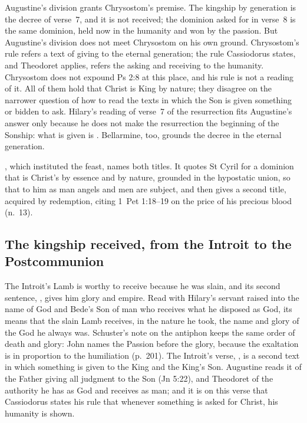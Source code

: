 Augustine's division grants Chrysostom's premise. The kingship by generation
is the decree of verse~7, and it is not received; the dominion asked for in
verse~8 is the same dominion, held now in the humanity and won by the passion.
But Augustine's division does not meet Chrysostom on his own ground. Chrysostom's rule refers a text
of giving to the eternal generation; the rule Cassiodorus states, and
Theodoret applies, refers the asking and receiving to the humanity. Chrysostom
does not expound Ps 2:8 at this place, and his rule is not a reading of it.
All of them hold that Christ is King by nature; they disagree on the narrower
question of how to read the texts in which the Son is given something or
bidden to ask. Hilary's reading of verse~7 of the resurrection fits Augustine's
answer only because he does not make the resurrection the beginning of the
Sonship: what is given is . Bellarmine, too,
grounds the decree in the eternal generation.

, which instituted the feast, names both titles. It quotes
St Cyril for a dominion that is Christ's by essence and by nature, grounded in
the hypostatic union, so that to him as man angels and men are subject, and
then gives a second title, acquired by redemption, citing 1~Pet 1:18--19 on the price of his precious
blood (n.~13).

\subsection{The kingship received, from the Introit to the Postcommunion}
\label{sec:lamb-elements}

The Introit's Lamb  is worthy to receive because he was
slain, and its second sentence, , gives him
glory and empire. Read with Hilary's servant raised into the name of God and
Bede's Son of man who receives what he disposed as God, its  means that the slain Lamb receives, in the nature he took,
the name and glory of the God he always was. Schuster's note on the antiphon
keeps the same order of death and glory: John names the Passion before the
glory, because the exaltation is in proportion to the humiliation (p.~201).
The Introit's verse, , is a second text in
which something is given to the King and the King's Son. Augustine reads it of
the Father giving all judgment to the Son (Jn 5:22), and Theodoret of the
authority he has as God and receives as man; and it is on this verse that
Cassiodorus states his rule that whenever something is asked for Christ, his
humanity is shown.

